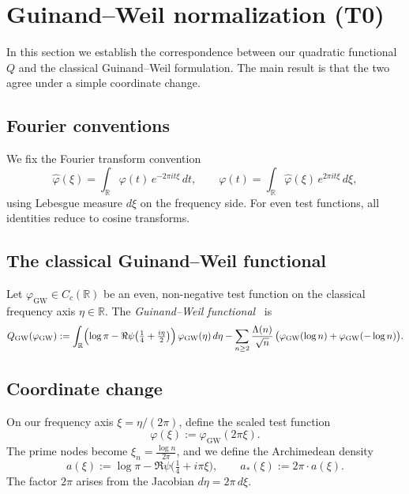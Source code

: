 \documentclass[11pt,a4paper]{article}
\theoremstyle{definition}
\theoremstyle{remark}
\newcommand{\R}{\mathbb{R}}
\begin{document}
\section{Guinand--Weil normalization (T0)}
\label{sec:T0}

In this section we establish the correspondence between our quadratic functional $Q$ and the classical Guinand--Weil formulation. The main result is that the two agree under a simple coordinate change.

\subsection{Fourier conventions}

We fix the Fourier transform convention
\begin{equation}\label{eq:FT}
  \widehat{\varphi}(\xi) = \int_\R \varphi(t)\, e^{-2\pi i t\xi}\, dt,
  \qquad
  \varphi(t) = \int_\R \widehat{\varphi}(\xi)\, e^{2\pi i t\xi}\, d\xi,
\end{equation}
using Lebesgue measure $d\xi$ on the frequency side. For even test functions, all identities reduce to cosine transforms.

\subsection{The classical Guinand--Weil functional}

Let $\varphi_{\mathrm{GW}} \in C_c(\R)$ be an even, non-negative test function on the classical frequency axis $\eta \in \R$. The \emph{Guinand--Weil functional}~\cite{Guinand1948,Weil1952} is
\begin{equation}\label{eq:QGW}
  Q_{\mathrm{GW}}(\varphi_{\mathrm{GW}}) := \int_\R \Bigl(\log\pi - \Re\psi\bigl(\tfrac{1}{4} + \tfrac{i\eta}{2}\bigr)\Bigr)\, \varphi_{\mathrm{GW}}(\eta)\, d\eta
  - \sum_{n \geq 2} \frac{\Lambda(n)}{\sqrt{n}}\, \bigl(\varphi_{\mathrm{GW}}(\log n) + \varphi_{\mathrm{GW}}(-\log n)\bigr).
\end{equation}

\subsection{Coordinate change}

On our frequency axis $\xi = \eta/(2\pi)$, define the scaled test function
\begin{equation}\label{eq:phi-scale}
  \varphi(\xi) := \varphi_{\mathrm{GW}}(2\pi\xi).
\end{equation}
The prime nodes become $\xi_n = \frac{\log n}{2\pi}$, and we define the Archimedean density
\begin{equation}\label{eq:astar}
  a(\xi) := \log\pi - \Re\psi\bigl(\tfrac{1}{4} + i\pi\xi\bigr),
  \qquad
  a_*(\xi) := 2\pi \cdot a(\xi).
\end{equation}
The factor $2\pi$ arises from the Jacobian $d\eta = 2\pi\, d\xi$.
\end{document}
